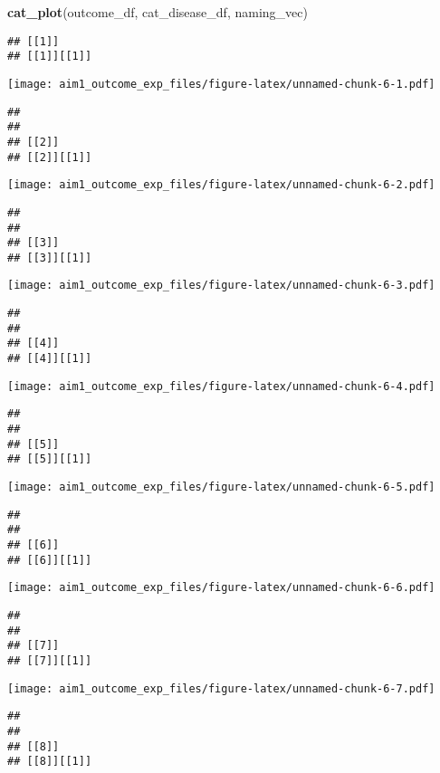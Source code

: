\documentclass[
]{article}
\newenvironment{Shaded}{\begin{snugshade}}{\end{snugshade}}
\newcommand{\FunctionTok}[1]{\textcolor[rgb]{0.13,0.29,0.53}{\textbf{#1}}}
\newcommand{\NormalTok}[1]{#1}
\begin{document}
\begin{Shaded}
\begin{Highlighting}[]
\FunctionTok{cat\_plot}\NormalTok{(outcome\_df, cat\_disease\_df, naming\_vec)}
\end{Highlighting}
\end{Shaded}

\begin{verbatim}
## [[1]]
## [[1]][[1]]
\end{verbatim}

\texttt{[image: aim1\_outcome\_exp\_files/figure-latex/unnamed-chunk-6-1.pdf]}

\begin{verbatim}
## 
## 
## [[2]]
## [[2]][[1]]
\end{verbatim}

\texttt{[image: aim1\_outcome\_exp\_files/figure-latex/unnamed-chunk-6-2.pdf]}

\begin{verbatim}
## 
## 
## [[3]]
## [[3]][[1]]
\end{verbatim}

\texttt{[image: aim1\_outcome\_exp\_files/figure-latex/unnamed-chunk-6-3.pdf]}

\begin{verbatim}
## 
## 
## [[4]]
## [[4]][[1]]
\end{verbatim}

\texttt{[image: aim1\_outcome\_exp\_files/figure-latex/unnamed-chunk-6-4.pdf]}

\begin{verbatim}
## 
## 
## [[5]]
## [[5]][[1]]
\end{verbatim}

\texttt{[image: aim1\_outcome\_exp\_files/figure-latex/unnamed-chunk-6-5.pdf]}

\begin{verbatim}
## 
## 
## [[6]]
## [[6]][[1]]
\end{verbatim}

\texttt{[image: aim1\_outcome\_exp\_files/figure-latex/unnamed-chunk-6-6.pdf]}

\begin{verbatim}
## 
## 
## [[7]]
## [[7]][[1]]
\end{verbatim}

\texttt{[image: aim1\_outcome\_exp\_files/figure-latex/unnamed-chunk-6-7.pdf]}

\begin{verbatim}
## 
## 
## [[8]]
## [[8]][[1]]
\end{verbatim}
\end{document}
